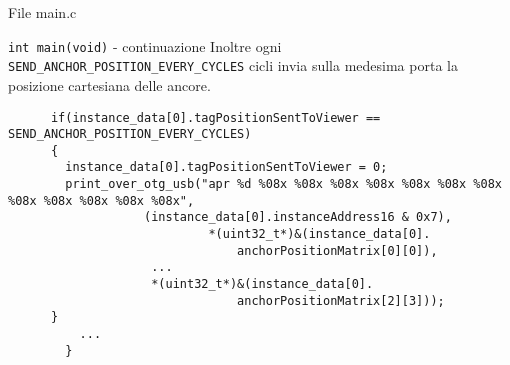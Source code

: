 \begin{frame}[fragile, shrink=30]{File main.c}
  \begin{block}{\lstinline!int main(void)! - continuazione}
    Inoltre ogni \lstinline!SEND_ANCHOR_POSITION_EVERY_CYCLES! cicli invia sulla medesima
    porta la posizione cartesiana delle ancore.
    \begin{lstlisting}
	  if(instance_data[0].tagPositionSentToViewer == SEND_ANCHOR_POSITION_EVERY_CYCLES)
	  {
	    instance_data[0].tagPositionSentToViewer = 0;
	    print_over_otg_usb("apr %d %08x %08x %08x %08x %08x %08x %08x %08x %08x %08x %08x %08x",
			       (instance_data[0].instanceAddress16 & 0x7),
	                        *(uint32_t*)&(instance_data[0].
                                anchorPositionMatrix[0][0]),
			        ...
			        *(uint32_t*)&(instance_data[0].
                                anchorPositionMatrix[2][3]));
	  }
          ...
        }
        \end{lstlisting}
  \end{block}
\end{frame}
